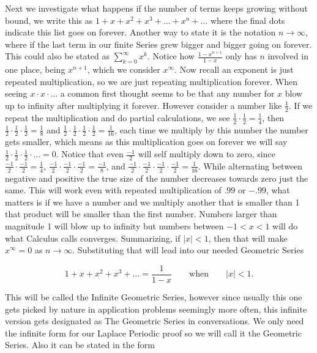 \documentclass[12pt]{article}
\begin{document}
Next we investigate what happens if the number of terms keeps growing without bound, we write this as $1+x+x^2+x^3+\ldots+x^n+\ldots$ where the final dots indicate this list goes on forever. Another way to state it is the notation $n \rightarrow \infty$, where if the last term in our finite Series grew bigger and bigger going on forever. This could also be stated as $\sum_{k=0}^{\infty} x^k$. Notice how $\frac{1-x^{n+1}}{1-x}$ only has $n$ involved in one place, being $x^{n+1}$, which we consider $x^{\infty}$. Now recall an exponent is just repeated multiplication, so we are just repeating multiplication forever. When seeing $x\cdot x\cdot \ldots$ a common first thought seems to be that any number for $x$ blow up to infinity after multiplying it forever. However consider a number like $\frac{1}{2}$. If we repeat the multiplication and do partial calculations, we see $\frac{1}{2}\cdot\frac{1}{2}=\frac{1}{4}$, then $\frac{1}{2}\cdot\frac{1}{2}\cdot\frac{1}{2}=\frac{1}{8}$ and $\frac{1}{2}\cdot\frac{1}{2}\cdot\frac{1}{2}\cdot\frac{1}{2}=\frac{1}{16}$, each time we multiply by this number the number gets smaller, which means as this multiplication goes on forever we will say $\frac{1}{2}\cdot\frac{1}{2}\cdot\frac{1}{2}\cdot\ldots=0$. Notice that even $\frac{-1}{2}$ will self multiply down to zero, since $\frac{-1}{2}\cdot\frac{-1}{2}=\frac{1}{4}$, $\frac{-1}{2}\cdot\frac{-1}{2}\cdot\frac{-1}{2}=\frac{-1}{8}$, and $\frac{-1}{2}\cdot\frac{-1}{2}\cdot\frac{-1}{2}\cdot\frac{-1}{2}=\frac{1}{16}$. While alternating between negative and positive the true size of the number decreases towards zero just the same. This will work even with repeated multiplication of $.99$ or $-.99$, what matters is if we have a number and we multiply another that is smaller than 1 that product will be smaller than the first number. Numbers larger than magnitude 1 will blow up to infinity but numbers between $-1<x<1$ will do what  Calculus calls converges. Summarizing, if $|x|<1$, then that will make $x^{\infty}=0$ as $n \rightarrow \infty$. Substituting that will lead into our needed Geometric Series

\begin{equation*} 
  1+x+x^2+x^3+\ldots= \frac{1}{1-x} \qquad \text{when} \qquad |x|<1.
\end{equation*}

This will be called the Infinite Geometric Series, however since usually this one gets picked by nature in application problems seemingly more often, this infinite version gets designated as The Geometric Series in conversations. We only need the infinite form for our Laplace Periodic proof so we will call it the Geometric Series. Also it can be stated in the form
\end{document}
